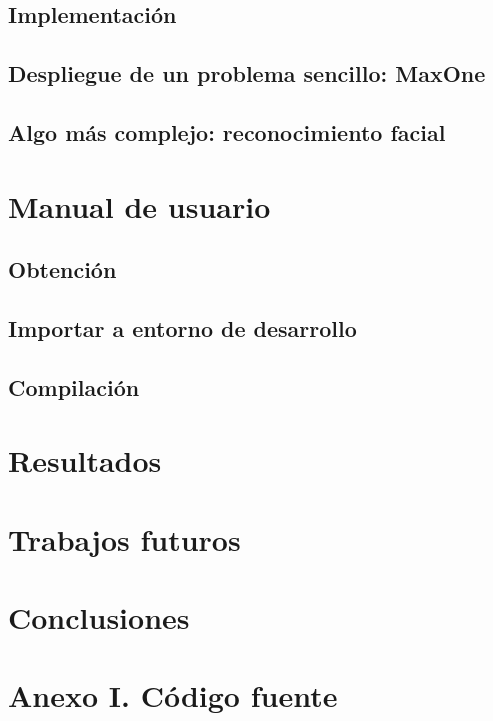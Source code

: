 \documentclass{estilos-y-libreria}
\begin{document}
	\section{Implementaci\'on}
		
	\section{Despliegue de un problema sencillo: MaxOne}
		
	\section{Algo m\'as complejo: reconocimiento facial}
		

\chapter{Manual de usuario}
	\section{Obtenci\'on}
		
	\section{Importar a entorno de desarrollo}
		
	\section{Compilaci\'on}
		

\chapter{Resultados}
	\label{resultados-maxone}

\chapter{Trabajos futuros}

\chapter{Conclusiones}

\chapter{Anexo I. C\'odigo fuente}

\end{document}
